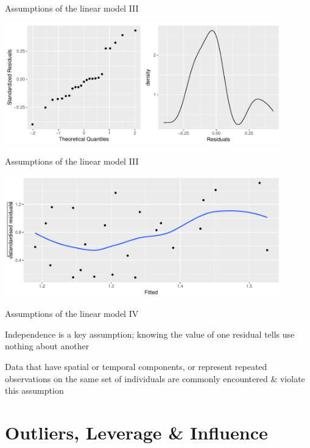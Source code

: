 \documentclass[10pt,ignorenonframetext,compress, aspectratio=169]{beamer}
\begin{document}
\begin{frame}{Assumptions of the linear model III}

\begin{center}\includegraphics[width=0.9\textwidth]{03-linear-models_files/figure-beamer/svmod-qqplot-1} \end{center}

\end{frame}

\begin{frame}{Assumptions of the linear model III}

\begin{center}\includegraphics[width=0.9\textwidth]{03-linear-models_files/figure-beamer/svmod-scale-location-plot-1} \end{center}

\end{frame}

\begin{frame}{Assumptions of the linear model IV}

\alert{Independence} is a key assumption; knowing the value of one
residual tells use nothing about another

Data that have spatial or temporal components, or represent repeated
observations on the same set of individuals are commonly encountered \&
violate this assumption

\end{frame}

\section{Outliers, Leverage \&
Influence}\label{outliers-leverage-influence}
\end{document}

